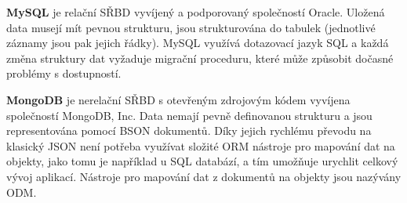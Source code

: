 \textbf{MySQL} je relační \gls{SŘBD} vyvíjený a podporovaný společností Oracle.
Uložená data musejí mít pevnou strukturu, jsou strukturována do tabulek (jednotlivé záznamy jsou pak jejich řádky).
MySQL využívá dotazovací jazyk SQL a každá změna struktury dat vyžaduje migrační proceduru, které může způsobit dočasné problémy s dostupností.~\cite{mongo:about}

\textbf{MongoDB} je nerelační \gls{SŘBD} s otevřeným zdrojovým kódem vyvíjena společností MongoDB, Inc.
Data nemají pevně definovanou strukturu a jsou representována pomocí \gls{BSON} dokumentů.
Díky jejich rychlému převodu na klasický \gls{JSON} není potřeba využívat složité \gls{ORM} nástroje pro mapování dat na objekty, jako tomu je například u \gls{SQL} databází, a tím umožňuje urychlit celkový vývoj aplikací.
Nástroje pro mapování dat z dokumentů na objekty jsou nazývány \gls{ODM}.~\cite{mongo:about}
